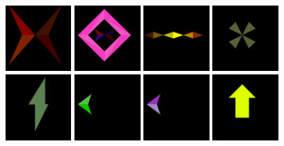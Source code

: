 \vspace*{\fill}
\begin{figure}[H]
  \centering
\includegraphics[width=2.5cm]{preface/obj2d/obj_0.png}
\includegraphics[width=2.5cm]{preface/obj2d/obj_1.png}
\includegraphics[width=2.5cm]{preface/obj2d/obj_10.png}
\includegraphics[width=2.5cm]{preface/obj2d/obj_13.png}
\includegraphics[width=2.5cm]{preface/obj2d/obj_14.png}
\includegraphics[width=2.5cm]{preface/obj2d/obj_15.png}
\includegraphics[width=2.5cm]{preface/obj2d/obj_16.png}
\includegraphics[width=2.5cm]{preface/obj2d/obj_17.png}

\end{figure}
